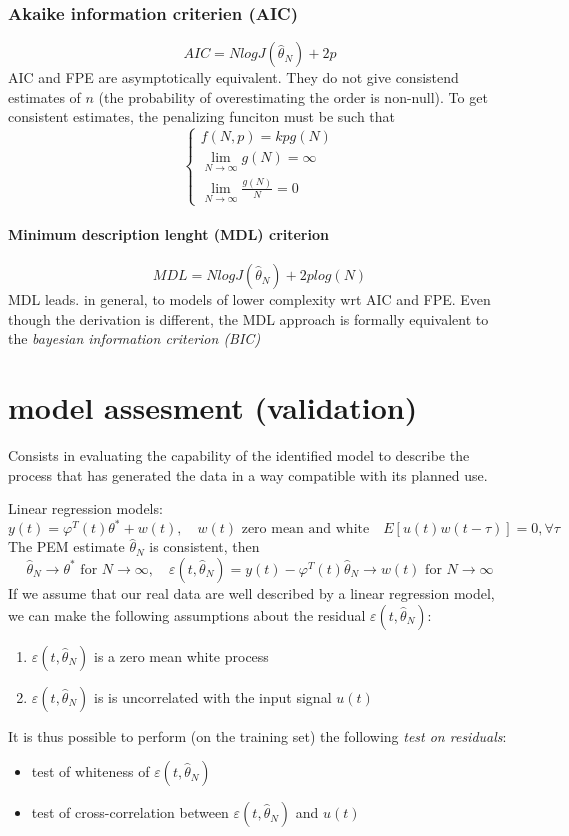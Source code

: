 \documentclass{book}
\begin{document}
\subsection{Akaike information criterien (AIC)}
\[
    AIC=NlogJ(\hat{\theta}_N)+2p
\]
AIC and FPE are asymptotically equivalent. They do not give consistend estimates of $n$ (the probability of overestimating the order is non-null). To get consistent estimates, the penalizing funciton must be such that
\[
    \begin{cases}
        f(N,p)=kpg(N)\\
        \lim_{N\to\infty}g(N)=\infty\\
        \lim_{N\to\infty}\displaystyle\frac{g(N)}{N}=0
    \end{cases}
\]
\subsubsection{Minimum description lenght (MDL) criterion}
\[
    MDL=N logJ(\hat{\theta}_N)+2plog(N)
\]
MDL leads. in general, to models of lower complexity wrt AIC and FPE. Even though the derivation is different, the MDL approach is formally equivalent to  the \emph{bayesian information criterion (BIC)}




\chapter{model assesment (validation)}

Consists in evaluating the capability of the identified model to describe the process that has generated the data in a way compatible with its planned use. 

Linear regression models:
\[
    y(t)=\varphi^T(t) \theta^*+w(t), \quad w(t) \text{ zero mean and white} \quad E[u(t)w(t-\tau)]=0,\forall \tau
\]
The PEM estimate $\hat{\theta}_N$ is consistent, then
\[
    \hat{\theta}_N \to \theta^* \text{ for } N\to \infty , \quad \varepsilon(t,\hat{\theta}_N)=y(t)-\varphi^T(t)\hat{\theta}_N \to w(t) \text{ for } N\to\infty
\]
If we assume that our real data are well described by a linear regression model, we can make the following assumptions about the residual $\varepsilon(t,\hat{\theta}_N)$:
\begin{enumerate}
    \item $\varepsilon(t,\hat{\theta}_N)$ is a zero mean white process
    \item $\varepsilon(t,\hat{\theta}_N)$ is is uncorrelated with the input signal $u(t)$
\end{enumerate}
It is thus possible to perform (on the training set) the following \emph{test on residuals}:
\begin{itemize}
    \item test of whiteness of $\varepsilon(t,\hat{\theta}_N)$
    \item test of cross-correlation between $\varepsilon(t,\hat{\theta}_N)$ and $u(t)$
\end{itemize}
\end{document}
